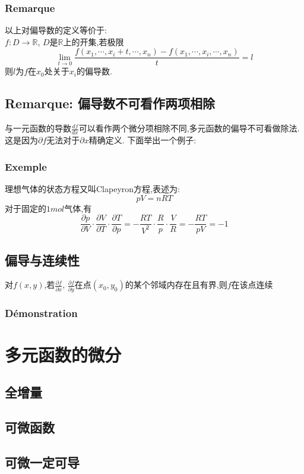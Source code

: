 \documentclass[12pt, a4paper, oneside]{ctexbook}
\begin{document}
  \subsubsection{Remarque}
  以上对偏导数的定义等价于:\\
  
  $f:D\rightarrow \mathbb{R}$, $D$是$\mathbb{R}$上的开集,若极限
  $$
  \lim_{t \to 0}\frac{f(x_1,\cdots,x_i+t,\cdots,x_n)-f(x_1,\cdots,x_i,\cdots,x_n)}{t}=l
  $$
  则$l$为$f$在$x_0$处关于$x_i$的偏导数.
  \subsection{Remarque: 偏导数不可看作两项相除}
  与一元函数的导数$\frac{d f}{d x}$可以看作两个微分项相除不同,多元函数的偏导不可看做除法.这是因为$\partial f$无法对于$\partial x$精确定义.
  下面举出一个例子:
  \subsubsection{Exemple}
  理想气体的状态方程又叫Clapeyron方程,表述为:
  $$
  pV=nRT
  $$
  对于固定的$1mol$气体,有
  $$
  \frac{\partial p}{\partial V}\cdot\frac{\partial V}{\partial T}\cdot\frac{\partial T}{\partial p}=-\frac{RT}{V^2}\cdot\frac{R}{p}\cdot\frac{V}{R}=-\frac{RT}{pV}=-1
  $$
  \subsection{偏导与连续性}
  对$f(x,y)$,若$\frac{\partial f}{\partial x},\, \frac{\partial f}{\partial y}$在点$(x_0,y_0)$的某个邻域内存在且有界,则$f$在该点连续
  \subsubsection{Démonstration}


\section{多元函数的微分}
  \subsection{全增量}
  \subsection{可微函数}
  \subsection{可微一定可导}
\end{document}
